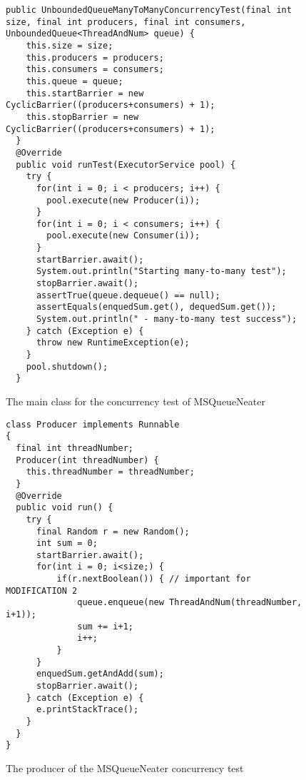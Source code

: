 \begin{figure}
\begin{lstlisting}
public UnboundedQueueManyToManyConcurrencyTest(final int size, final int producers, final int consumers, UnboundedQueue<ThreadAndNum> queue) {
    this.size = size;
    this.producers = producers;
    this.consumers = consumers;
    this.queue = queue;
    this.startBarrier = new CyclicBarrier((producers+consumers) + 1);
    this.stopBarrier = new CyclicBarrier((producers+consumers) + 1);
  }
  @Override
  public void runTest(ExecutorService pool) {
    try {
      for(int i = 0; i < producers; i++) {
        pool.execute(new Producer(i));
      }
      for(int i = 0; i < consumers; i++) {
        pool.execute(new Consumer(i));
      }
      startBarrier.await();
      System.out.println("Starting many-to-many test");
      stopBarrier.await();
      assertTrue(queue.dequeue() == null);
      assertEquals(enquedSum.get(), dequedSum.get());
      System.out.println(" - many-to-many test success");
    } catch (Exception e) {
      throw new RuntimeException(e);
    }
    pool.shutdown();
  }
\end{lstlisting}
\caption{The main class for the concurrency test of MSQueueNeater}
\label{code:5:2-1}
\end{figure}

\begin{figure}
\begin{lstlisting}
class Producer implements Runnable
{
  final int threadNumber;
  Producer(int threadNumber) {
    this.threadNumber = threadNumber;
  }
  @Override
  public void run() {
    try {
      final Random r = new Random();
      int sum = 0;
      startBarrier.await();
      for(int i = 0; i<size;) {
          if(r.nextBoolean()) { // important for MODIFICATION 2
              queue.enqueue(new ThreadAndNum(threadNumber, i+1));
              sum += i+1;
              i++;
          }
      }
      enquedSum.getAndAdd(sum);
      stopBarrier.await();
    } catch (Exception e) {
      e.printStackTrace();
    }
  }
}
\end{lstlisting}
\caption{The producer of the MSQueueNeater concurrency test}
\label{code:5:2-2}
\end{figure}

